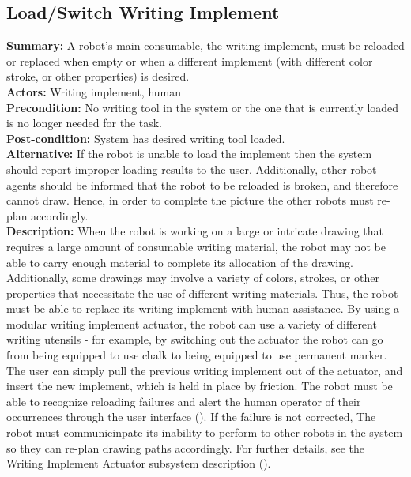 \subsection{Load/Switch Writing Implement}
\textbf{Summary:} A robot's main consumable, the writing implement, must be reloaded or replaced when empty or when a different implement (with different color stroke, or other properties) is desired. \\
\textbf{Actors:}  Writing implement, human \\
\textbf{Precondition:} No writing tool in the system or the one that is currently loaded is no longer needed for the task. \\
\textbf{Post-condition:} System has desired writing tool loaded. \\
\textbf{Alternative:} If the robot is unable to load the implement then the system should report improper loading results to the user. Additionally, other robot agents should be informed that the robot to be reloaded is broken, and therefore cannot draw. Hence, in order to complete the picture the other robots must re-plan accordingly. \\
\textbf{Description:} When the robot is working on a large or intricate drawing that requires a large amount of consumable writing material, the robot may not be able to carry enough material to complete its allocation of the drawing. Additionally, some drawings may involve a variety of colors, strokes, or other properties that necessitate the use of different writing materials. Thus, the robot must be able to replace its writing implement with human assistance. By using a modular writing implement actuator, the robot can use a variety of different writing utensils - for example, by switching out the actuator the robot can go from being equipped to use chalk to being equipped to use permanent marker. The user can simply pull the previous writing implement out of the actuator, and insert the new implement, which is held in place by friction. The robot must be able to recognize reloading failures and alert the human operator of their occurrences through the user interface (). If the failure is not corrected, The robot must communicinpate its inability to perform to other robots in the system so they can re-plan drawing paths accordingly. For further details, see the Writing Implement Actuator subsystem description ().\\

